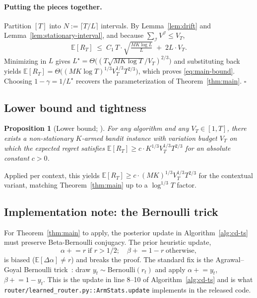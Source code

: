 \documentclass[11pt]{article}
\newtheorem{proposition}[theorem]{Proposition}
\theoremstyle{definition}
\newcommand{\E}{\mathbb{E}}
\newcommand{\Bern}{\mathrm{Bernoulli}}
\begin{document}
\paragraph{Putting the pieces together.}
Partition $[T]$ into $N := \lceil T/L \rceil$ intervals. By
Lemma~\ref{lem:drift} and Lemma~\ref{lem:stationary-interval}, and
because $\sum_{\mathcal{I}} V^{\mathcal{I}} \leq V_T$,
\begin{equation}
\E[R_T] \;\leq\; C_1 \,T \cdot \sqrt{\tfrac{MK \log L}{L}} \;+\; 2 L \cdot V_T.
\label{eq:tradeoff}
\end{equation}
Minimizing in $L$ gives
$L^\star = \Theta\!\big((T\sqrt{MK \log T}/V_T)^{2/3}\big)$ and substituting
back yields
$\E[R_T] = \Theta\!\big((MK \log T)^{1/3} V_T^{1/3} T^{2/3}\big)$, which
proves \eqref{eq:main-bound}. Choosing $1-\gamma = 1/L^\star$ recovers the
parameterization of Theorem~\ref{thm:main}. \hfill$\square$

\subsection{Lower bound and tightness}

\begin{proposition}[Lower bound; \cite{besbes2014stochastic}]
\label{prop:lower}
For any algorithm and any $V_T \in [1, T]$, there exists a non-stationary
$K$-armed bandit instance with variation budget $V_T$ on which the expected
regret satisfies
$\E[R_T] \geq c \cdot K^{1/3} V_T^{1/3} T^{2/3}$
for an absolute constant $c > 0$.
\end{proposition}

Applied per context, this yields $\E[R_T] \geq c \cdot (MK)^{1/3} V_T^{1/3} T^{2/3}$
for the contextual variant, matching Theorem~\ref{thm:main} up to a
$\log^{1/3} T$ factor.

\subsection{Implementation note: the Bernoulli trick}
\label{sec:impl-note}

For Theorem~\ref{thm:main} to apply, the posterior update in
Algorithm~\ref{alg:cd-ts} must preserve Beta-Bernoulli conjugacy. The
prior heuristic update,
\[
\alpha \mathrel{+}= r \; \text{if } r > 1/2; \quad \beta \mathrel{+}= 1-r \; \text{otherwise},
\]
is biased ($\E[\Delta \alpha] \neq r$) and breaks the proof. The standard
fix is the Agrawal--Goyal Bernoulli trick~\cite{agrawal2012analysis}: draw
$y_t \sim \Bern(r_t)$ and apply $\alpha \mathrel{+}= y_t$,
$\beta \mathrel{+}= 1 - y_t$. This is the update in line 8--10 of
Algorithm~\ref{alg:cd-ts} and is what \texttt{router/learned\_router.py::ArmStats.update}
implements in the released code.
\end{document}
